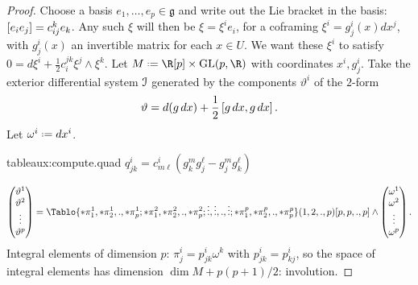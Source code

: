 \begin{proof}
Choose a basis \(e_1,\dots,e_p\in\mathfrak{g}\) and write out the Lie bracket in the basis: \(\lb{e_i}{e_j}=c^k_{ij}e_k\).
Any such \(\xi\) will then be \(\xi=\xi^ie_i\), for a coframing \(\xi^i=g^i_j(x)dx^j\), with \(g^i_j(x)\) an invertible matrix for each \(x\in U\).
We want these \(\xi^i\) to satisfy \(0=d\xi^i+\frac{1}{2}c_i^{jk} \xi^j\wedge\xi^k\).
Let \(M\defeq \R[p] \times \GL{p,\R}\) with coordinates \(x^i,g^i_j\).
Take the exterior differential system \(\mathcal{I}\) generated by the components \(\vartheta^i\) of the \(2\)-form
\[
\vartheta=d(g\, dx) + \frac{1}{2}\lb*{g \, dx}{g \, dx}.
\]
Let \(\omega^i\defeq dx^i\).
\begin{answer}{tableaux:compute.quad}
\(q^i_{jk} = c^i_{m\ell}(g^m_kg^{\ell}_j-g^m_jg^{\ell}_k)\)
\end{answer}
\[
\begin{pmatrix}
\vartheta^1\\
\vartheta^2\\
\vdots\\
\vartheta^p
\end{pmatrix}
=
\Tablo{%
*\pi^1_1,*\pi^1_2,.,*\pi^1_p;
*\pi^2_1,*\pi^2_2,.,*\pi^2_p;
\vdots,\vdots,.,\vdots;
*\pi^p_1,*\pi^p_2,.,*\pi^p_p}%
(1,2,.,p)[p,p,.,p]
\wedge
\begin{pmatrix}
\omega^1 \\
\omega^2 \\
\vdots\\
\omega^p
\end{pmatrix}.
\]
Integral elements of dimension \(p\): \(\pi^i_j=p^i_{jk}\omega^k\) with \(p^i_{jk}=p^i_{kj}\), so the space of integral elements has dimension \(\dim M+p(p+1)/2\): involution.
\end{proof}

